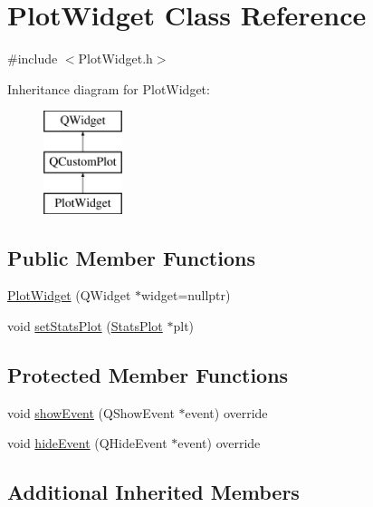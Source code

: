 \hypertarget{class_plot_widget}{}\section{Plot\+Widget Class Reference}
\label{class_plot_widget}


{\ttfamily \#include $<$Plot\+Widget.\+h$>$}

Inheritance diagram for Plot\+Widget\+:\begin{figure}[H]
\begin{center}
\leavevmode
\includegraphics[height=3.000000cm]{d0/d13/class_plot_widget}
\end{center}
\end{figure}
\subsection*{Public Member Functions}
\begin{DoxyCompactItemize}
\item 
\mbox{\hyperlink{class_plot_widget_af5f42d7c08b2c4344492609710ca682c}{Plot\+Widget}} (Q\+Widget $\ast$widget=nullptr)
\item 
void \mbox{\hyperlink{class_plot_widget_a15d04f00848ea016b327742a3fbd2ef2}{set\+Stats\+Plot}} (\mbox{\hyperlink{class_stats_plot}{Stats\+Plot}} $\ast$plt)
\end{DoxyCompactItemize}
\subsection*{Protected Member Functions}
\begin{DoxyCompactItemize}
\item 
void \mbox{\hyperlink{class_plot_widget_aeae368be52406c92818fab8095d9aa68}{show\+Event}} (Q\+Show\+Event $\ast$event) override
\item 
void \mbox{\hyperlink{class_plot_widget_a9e65822a4990eb5c9f9a65e302643870}{hide\+Event}} (Q\+Hide\+Event $\ast$event) override
\end{DoxyCompactItemize}
\subsection*{Additional Inherited Members}


